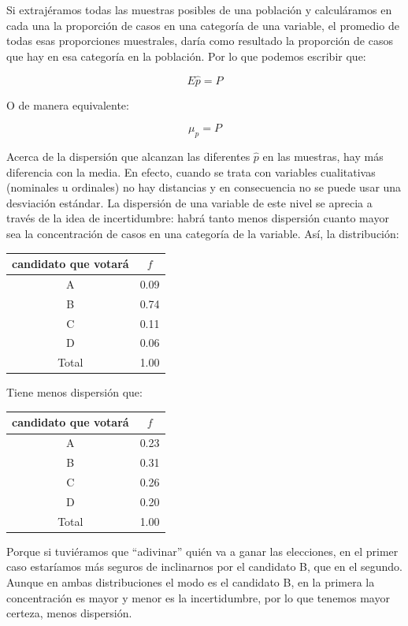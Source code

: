 \documentclass[]{book}
\begin{document}
Si extrajéramos todas las muestras posibles de una población y
calculáramos en cada una la proporción de casos en una categoría de una
variable, el promedio de todas esas proporciones muestrales, daría como
resultado la proporción de casos que hay en esa categoría en la
población. Por lo que podemos escribir que:

\[E\widehat{p} = P\]

O de manera equivalente:

\[\mu_{\widehat{p}} = P\]

Acerca de la dispersión que alcanzan las diferentes \(\widehat{p}\) en las
muestras, hay más diferencia con la media. En efecto, cuando se trata
con variables cualitativas (nominales u ordinales) no hay distancias y
en consecuencia no se puede usar una desviación estándar. La dispersión
de una variable de este nivel se aprecia a través de la idea de
incertidumbre: habrá tanto menos dispersión cuanto mayor sea la
concentración de casos en una categoría de la variable. Así, la
distribución:

\begin{table}[H]
\centering
\begin{tabular}{cc}
\toprule
candidato que votará & $f$\\
\midrule
\rowcolor{gray!6}  A & 0.09\\
B & 0.74\\
\rowcolor{gray!6}  C & 0.11\\
D & 0.06\\
\rowcolor{gray!6}  Total & 1.00\\
\bottomrule
\end{tabular}
\end{table}

Tiene menos dispersión que:

\begin{table}[H]
\centering
\begin{tabular}{cc}
\toprule
candidato que votará & $f$\\
\midrule
\rowcolor{gray!6}  A & 0.23\\
B & 0.31\\
\rowcolor{gray!6}  C & 0.26\\
D & 0.20\\
\rowcolor{gray!6}  Total & 1.00\\
\bottomrule
\end{tabular}
\end{table}

Porque si tuviéramos que ``adivinar'' quién va a ganar las elecciones, en
el primer caso estaríamos más seguros de inclinarnos por el candidato B,
que en el segundo. Aunque en ambas distribuciones el modo es el
candidato B, en la primera la concentración es mayor y menor es la
incertidumbre, por lo que tenemos mayor certeza, menos dispersión.
\end{document}

